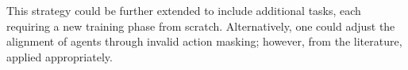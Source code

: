 \bigskip

\noindent This strategy could be further extended to include additional tasks, each requiring a new training phase from scratch. Alternatively, one could adjust the alignment of agents through invalid action masking; however,  from the literature, applied appropriately.

